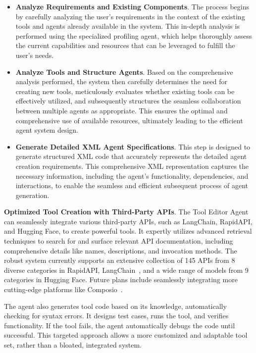 \begin{itemize}[leftmargin=*]
\item \textbf{Analyze Requirements and Existing Components}. The process begins by carefully analyzing the user's requirements in the context of the existing tools and agents already available in the system. This in-depth analysis is performed using the specialized profiling agent, which helps thoroughly assess the current capabilities and resources that can be leveraged to fulfill the user's needs.

\item \textbf{Analyze Tools and Structure Agents}. Based on the comprehensive analysis performed, the system then carefully determines the need for creating new tools, meticulously evaluates whether existing tools can be effectively utilized, and subsequently structures the seamless collaboration between multiple agents as appropriate. This ensures the optimal and comprehensive use of available resources, ultimately leading to the efficient agent system design.

\item \textbf{Generate Detailed XML Agent Specifications}. This step is designed to generate structured XML code that accurately represents the detailed agent creation requirements. This comprehensive XML representation captures the necessary information, including the agent's functionality, dependencies, and interactions, to enable the seamless and efficient subsequent process of agent generation.

\end{itemize}

\noindent \textbf{Optimized Tool Creation with Third-Party APIs}. The Tool Editor Agent can seamlessly integrate various third-party APIs, such as LangChain, RapidAPI, and Hugging Face, to create powerful tools. It expertly utilizes advanced retrieval techniques to search for and surface relevant API documentation, including comprehensive details like names, descriptions, and invocation methods. The robust system currently supports an extensive collection of 145 APIs from 8 diverse categories in RapidAPI, LangChain~\cite{langchain2023}, and a wide range of models from 9 categories in Hugging Face. Future plans include seamlessly integrating more cutting-edge platforms like Composio~\cite{composio2023}.

The agent also generates tool code based on its knowledge, automatically checking for syntax errors. It designs test cases, runs the tool, and verifies functionality. If the tool fails, the agent automatically debugs the code until successful. This targeted approach allows a more customized and adaptable tool set, rather than a bloated, integrated system.

